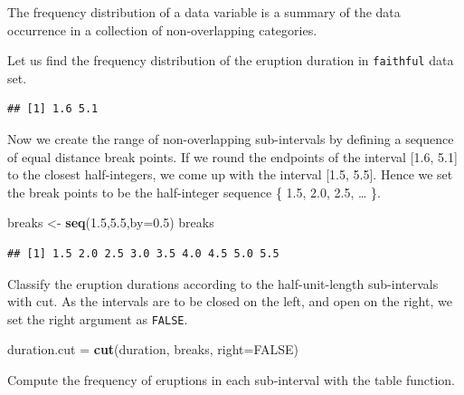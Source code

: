 \documentclass[]{article}
\newenvironment{Shaded}{\begin{snugshade}}{\end{snugshade}}
\newcommand{\KeywordTok}[1]{\textcolor[rgb]{0.13,0.29,0.53}{\textbf{{#1}}}}
\newcommand{\DataTypeTok}[1]{\textcolor[rgb]{0.13,0.29,0.53}{{#1}}}
\newcommand{\FloatTok}[1]{\textcolor[rgb]{0.00,0.00,0.81}{{#1}}}
\newcommand{\StringTok}[1]{\textcolor[rgb]{0.31,0.60,0.02}{{#1}}}
\newcommand{\OtherTok}[1]{\textcolor[rgb]{0.56,0.35,0.01}{{#1}}}
\newcommand{\NormalTok}[1]{{#1}}
\numberwithin{equation}{section}
\begin{document}
The frequency distribution of a data variable is a summary of the data
occurrence in a collection of non-overlapping categories.

Let us find the frequency distribution of the eruption duration in
\texttt{faithful} data set.

\begin{Shaded}
\end{Shaded}

\begin{verbatim}
## [1] 1.6 5.1
\end{verbatim}

Now we create the range of non-overlapping sub-intervals by defining a
sequence of equal distance break points. If we round the endpoints of
the interval {[}1.6, 5.1{]} to the closest half-integers, we come up
with the interval {[}1.5, 5.5{]}. Hence we set the break points to be
the half-integer sequence \{ 1.5, 2.0, 2.5, \ldots{} \}.

\begin{Shaded}
\begin{Highlighting}[]
\NormalTok{breaks <-}\StringTok{ }\KeywordTok{seq}\NormalTok{(}\FloatTok{1.5}\NormalTok{,}\FloatTok{5.5}\NormalTok{,}\DataTypeTok{by=}\FloatTok{0.5}\NormalTok{)}
\NormalTok{breaks}
\end{Highlighting}
\end{Shaded}

\begin{verbatim}
## [1] 1.5 2.0 2.5 3.0 3.5 4.0 4.5 5.0 5.5
\end{verbatim}

Classify the eruption durations according to the half-unit-length
sub-intervals with cut. As the intervals are to be closed on the left,
and open on the right, we set the right argument as \texttt{FALSE}.

\begin{Shaded}
\begin{Highlighting}[]
\NormalTok{duration.cut =}\StringTok{ }\KeywordTok{cut}\NormalTok{(duration, breaks, }\DataTypeTok{right=}\OtherTok{FALSE}\NormalTok{) }
\end{Highlighting}
\end{Shaded}

Compute the frequency of eruptions in each sub-interval with the table
function.
\end{document}

